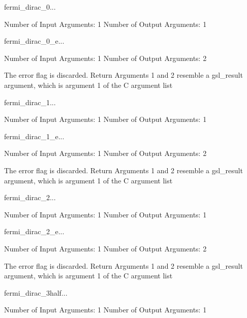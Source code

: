 \begin{funcdesc}{fermi_dirac_0}{...}

    Number of Input  Arguments:  1
    Number of Output Arguments:  1
\end{funcdesc}

\begin{funcdesc}{fermi_dirac_0_e}{...}

    Number of Input  Arguments:  1
    Number of Output Arguments:  2

The error flag is discarded.
Return Arguments 1 and 2 resemble a gsl_result argument,
	which is  argument 1 of the C argument list

\end{funcdesc}

\begin{funcdesc}{fermi_dirac_1}{...}

    Number of Input  Arguments:  1
    Number of Output Arguments:  1
\end{funcdesc}

\begin{funcdesc}{fermi_dirac_1_e}{...}

    Number of Input  Arguments:  1
    Number of Output Arguments:  2

The error flag is discarded.
Return Arguments 1 and 2 resemble a gsl_result argument,
	which is  argument 1 of the C argument list

\end{funcdesc}

\begin{funcdesc}{fermi_dirac_2}{...}

    Number of Input  Arguments:  1
    Number of Output Arguments:  1
\end{funcdesc}

\begin{funcdesc}{fermi_dirac_2_e}{...}

    Number of Input  Arguments:  1
    Number of Output Arguments:  2

The error flag is discarded.
Return Arguments 1 and 2 resemble a gsl_result argument,
	which is  argument 1 of the C argument list

\end{funcdesc}

\begin{funcdesc}{fermi_dirac_3half}{...}

    Number of Input  Arguments:  1
    Number of Output Arguments:  1
\end{funcdesc}

